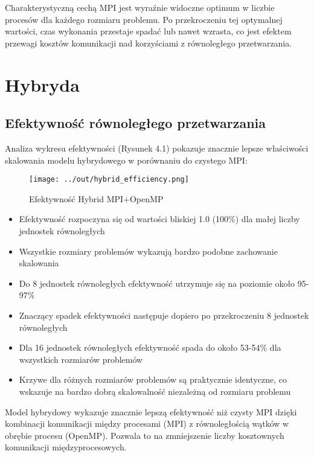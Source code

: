 \documentclass[12pt,a4paper]{report}
\begin{document}
Charakterystyczną cechą MPI jest wyraźnie widoczne optimum w liczbie procesów dla każdego rozmiaru problemu. Po przekroczeniu tej optymalnej wartości, czas wykonania przestaje spadać lub nawet wzrasta, co jest efektem przewagi kosztów komunikacji nad korzyściami z równoległego przetwarzania.

\chapter{Hybryda}
\section{Efektywność równoległego przetwarzania}
Analiza wykresu efektywności (Rysunek 4.1) pokazuje znacznie lepsze właściwości skalowania modelu hybrydowego w porównaniu do czystego MPI:
\begin{figure}[h]
    \centering
    \texttt{[image: ../out/hybrid\_efficiency.png]}
    \caption{Efektywność Hybrid MPI+OpenMP}
    \label{fig:hybrid_efficiency}
\end{figure}
\begin{itemize}
    \item Efektywność rozpoczyna się od wartości bliskiej 1.0 (100\%) dla małej liczby jednostek równoległych
    \item Wszystkie rozmiary problemów wykazują bardzo podobne zachowanie skalowania
    \item Do 8 jednostek równoległych efektywność utrzymuje się na poziomie około 95-97\%
    \item Znaczący spadek efektywności następuje dopiero po przekroczeniu 8 jednostek równoległych
    \item Dla 16 jednostek równoległych efektywność spada do około 53-54\% dla wszystkich rozmiarów problemów
    \item Krzywe dla różnych rozmiarów problemów są praktycznie identyczne, co wskazuje na bardzo dobrą skalowalność niezależną od rozmiaru problemu
\end{itemize}

Model hybrydowy wykazuje znacznie lepszą efektywność niż czysty MPI dzięki kombinacji komunikacji między procesami (MPI) z równoległością wątków w obrębie procesu (OpenMP). Pozwala to na zmniejszenie liczby kosztownych komunikacji międzyprocesowych.
\end{document}
